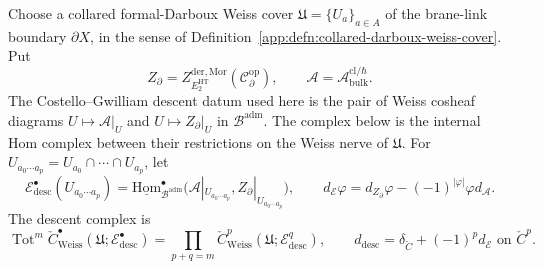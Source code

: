 \begin{defn}
\label{defn:typed-brane-link-descent-cone-datum}
Choose a collared formal-Darboux Weiss cover
\(\mathfrak U=\{U_a\}_{a\in A}\) of the brane-link boundary
\(\partial X\), in the sense of
Definition~\ref{app:defn:collared-darboux-weiss-cover}.  Put
\[
  Z_\partial=
  Z^{\mathrm{der},\mathrm{Mor}}_{E_2^{\mathrm{HT}}}
  (\mathcal C^{\mathrm{op}}_\partial),
  \qquad
  \mathcal A=\mathcal A^{\mathrm{cl}/\hbar}_{\mathrm{bulk}} .
\]
The Costello--Gwilliam descent datum used here is the pair of Weiss
cosheaf diagrams
\(U\mapsto \mathcal A|_U\) and \(U\mapsto Z_\partial|_U\) in
\(\mathcal B^{\mathrm{adm}}\).  The complex below is the internal Hom
complex between their restrictions on the Weiss nerve of
\(\mathfrak U\).
For \(U_{a_0\cdots a_p}=U_{a_0}\cap\cdots\cap U_{a_p}\), let
\[
  \mathcal E^\bullet_{\mathrm{desc}}(U_{a_0\cdots a_p})
  =
  \underline{\mathrm{Hom}}^\bullet_{\mathcal B^{\mathrm{adm}}}
  \bigl(\mathcal A|_{U_{a_0\cdots a_p}},
        Z_\partial|_{U_{a_0\cdots a_p}}\bigr),
  \qquad
  d_{\mathcal E}\varphi
  =
  d_{Z_\partial}\varphi-(-1)^{|\varphi|}\varphi d_{\mathcal A}.
\]
The descent complex is
\[
  \operatorname{Tot}^m\check C^\bullet_{\mathrm{Weiss}}
  (\mathfrak U;\mathcal E^\bullet_{\mathrm{desc}})
  =
  \prod_{p+q=m}
  \check C^p_{\mathrm{Weiss}}
  (\mathfrak U;\mathcal E^q_{\mathrm{desc}}),
  \qquad
  d_{\mathrm{desc}}=\delta_{\check C}+(-1)^p d_{\mathcal E}
  \text{ on }\check C^p .
\]


\end{defn}
